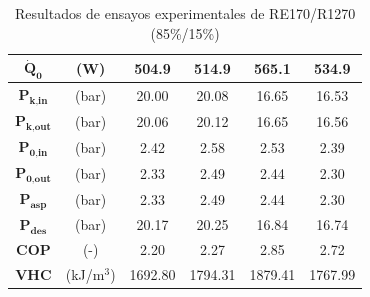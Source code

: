 \documentclass[../main.tex]{subfiles}
\begin{document}
\begin{table}[ht]
\begin{tabular}{cc|c|c|c|c|}
\hline
\multicolumn{1}{|c}{$\dot{\textbf{Q}}_\textbf{0}$} & (W) & 504.9 & 514.9 & 565.1 & 534.9 \\
\hline
\multicolumn{1}{|c}{$\textbf{P}_\textbf{k,in}$} & (bar) & 20.00 & 20.08 & 16.65 & 16.53 \\
\hline
\multicolumn{1}{|c}{$\textbf{P}_\textbf{k,out}$} & (bar) & 20.06 & 20.12 & 16.65 & 16.56 \\
\hline
\multicolumn{1}{|c}{$\textbf{P}_\textbf{0,in}$} & (bar) & 2.42 & 2.58 & 2.53 & 2.39 \\
\hline
\multicolumn{1}{|c}{$\textbf{P}_\textbf{0,out}$} & (bar) & 2.33 & 2.49 & 2.44 & 2.30 \\
\hline
\multicolumn{1}{|c}{$\textbf{P}_\textbf{asp}$} & (bar) & 2.33 & 2.49 & 2.44 & 2.30 \\
\hline
\multicolumn{1}{|c}{$\textbf{P}_\textbf{des}$} & (bar) & 20.17 & 20.25 & 16.84 & 16.74 \\
\hline
\multicolumn{1}{|c}{$\textbf{COP}$} & (-) & 2.20 & 2.27 & 2.85 & 2.72 \\
\hline
\multicolumn{1}{|c}{$\textbf{VHC}$} & (kJ/m$^3$) & 1692.80 & 1794.31 & 1879.41 & 1767.99 \\
\hline
\end{tabular}
\caption{\centering Resultados de ensayos experimentales de RE170/R1270 (85\%/15\%)}
\label{tab:RE170_R1270_85_15_anexo}
\end{table}
\end{document}
